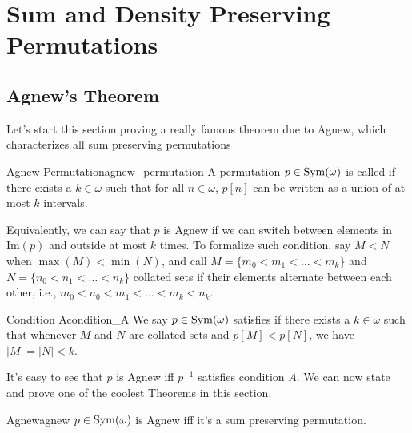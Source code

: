 \chapter{Sum and Density Preserving Permutations}

\section{Agnew's Theorem}

Let's start this section proving a really famous theorem due to Agnew, which characterizes all sum preserving permutations

\begin{definition}{Agnew Permutation}{agnew_permutation}
    A permutation $p\in\mathrm{Sym}(\omega)$ is called  if there exists a $k\in\omega$ such that for all $n\in\omega$, $p[n]$ can be written as a union of at most $k$ intervals.
\end{definition}

Equivalently, we can say that $p$ is Agnew if we can switch between elements in $\text{Im}(p)$ and outside at most $k$ times. To formalize such condition, say $M<N$ when $\max(M)<\min(N)$, and call $M=\{m_0<m_1<\dots<m_k\}$ and $N=\{n_0<n_1<\dots<n_k\}$ collated sets if their elements alternate between each other, i.e., $m_0<n_0<m_1<\dots<m_k<n_k$.

\begin{definition}{Condition A}{condition_A}
    We say $p\in\mathrm{Sym}(\omega)$ satisfies  if there exists a $k\in\omega$ such that whenever $M$ and $N$ are collated sets and $p[M]<p[N]$, we have $|M|=|N|<k$.
\end{definition}

It's easy to see that $p$ is Agnew iff $p^{-1}$ satisfies condition $A$. We can now state and prove one of the coolest Theorems in this section.

\begin{theorem}{Agnew}{agnew}
    $p\in\mathrm{Sym}(\omega)$ is Agnew iff it's a sum preserving permutation.
\end{theorem}

